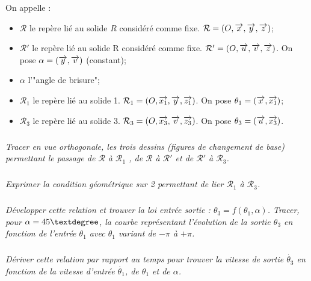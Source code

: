 \documentclass[10pt,fleqn]{article} %
\begin{document}
\begin{multicols}{2}
On appelle : 
\begin{itemize}
\item $\mathcal{R}$ le repère lié au solide $R$ considéré comme fixe. $\mathcal{R}=\left(O,\overrightarrow{x},\overrightarrow{y},\overrightarrow{z} \right)$;
\item $\mathcal{R}'$ le repère lié au solide R considéré comme fixe. $\mathcal{R}'=\left(O,\overrightarrow{u},\overrightarrow{v},\overrightarrow{z} \right)$. On pose $\alpha = \left(\overrightarrow{y},\overrightarrow{v} \right)$ (constant);
\item $\alpha$ l'"angle de brisure";
\item $\mathcal{R}_1$ le repère lié au solide 1. $\mathcal{R}_1 = \left(O,\overrightarrow{x_1},\overrightarrow{y},\overrightarrow{z_1} \right)$. On pose  $\theta_1 = \left(\overrightarrow{x},\overrightarrow{x_1} \right)$;
\item $\mathcal{R}_3$ le repère lié au solide 3. $\mathcal{R}_3 = \left(O,\overrightarrow{x_3},\overrightarrow{v},\overrightarrow{z_3} \right)$. On pose $\theta_3 = \left(\overrightarrow{u},\overrightarrow{x_3} \right)$.
\end{itemize}

\subparagraph{}
\textit{Tracer en vue orthogonale, les trois dessins (figures de changement de base) permettant le passage de $\mathcal{R}$ à $\mathcal{R}_1$ , de $\mathcal{R}$ à $\mathcal{R}'$ et de $\mathcal{R}'$ à $\mathcal{R}_3$.}
\ifprof
\begin{corrige}
\end{corrige}
\else \fi

\subparagraph{}
\textit{Exprimer la condition géométrique sur 2 permettant de lier $\mathcal{R}_1$ à $\mathcal{R}_3$.}
\ifprof
\begin{corrige}
\end{corrige}
\else \fi

\subparagraph{}
\textit{Développer cette relation et trouver la loi entrée sortie : $\theta_3 = f(\theta_1 , \alpha)$. Tracer, pour $\alpha=45\textdegree$, la courbe représentant l’évolution de la sortie $\theta_3$ en fonction de l’entrée $\theta_1$ avec $\theta_1$ variant de $-\pi$ à $+\pi$.}
\ifprof
\begin{corrige}
\end{corrige}
\else \fi

\subparagraph{}
\textit{Dériver cette relation par rapport au temps pour trouver la vitesse de sortie $\dot{\theta_3}$ en fonction de la vitesse d’entrée $\dot{\theta_1}$, de $\theta_1$ et de $\alpha$.}

\ifprof
\begin{corrige}
\end{corrige}
\else \fi


\end{multicols}
\end{document}
